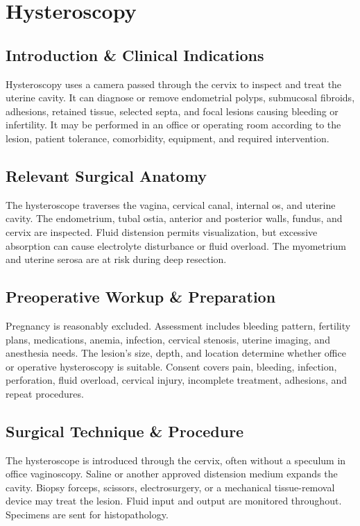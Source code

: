 \chapter{Hysteroscopy}

\section*{Introduction \& Clinical Indications}
Hysteroscopy uses a camera passed through the cervix to inspect and treat the uterine cavity. It can diagnose or remove endometrial polyps, submucosal fibroids, adhesions, retained tissue, selected septa, and focal lesions causing bleeding or infertility. It may be performed in an office or operating room according to the lesion, patient tolerance, comorbidity, equipment, and required intervention.

\section*{Relevant Surgical Anatomy}
The hysteroscope traverses the vagina, cervical canal, internal os, and uterine cavity. The endometrium, tubal ostia, anterior and posterior walls, fundus, and cervix are inspected. Fluid distension permits visualization, but excessive absorption can cause electrolyte disturbance or fluid overload. The myometrium and uterine serosa are at risk during deep resection.

\section*{Preoperative Workup \& Preparation}
Pregnancy is reasonably excluded. Assessment includes bleeding pattern, fertility plans, medications, anemia, infection, cervical stenosis, uterine imaging, and anesthesia needs. The lesion's size, depth, and location determine whether office or operative hysteroscopy is suitable. Consent covers pain, bleeding, infection, perforation, fluid overload, cervical injury, incomplete treatment, adhesions, and repeat procedures.

\section*{Surgical Technique \& Procedure}
The hysteroscope is introduced through the cervix, often without a speculum in office vaginoscopy. Saline or another approved distension medium expands the cavity. Biopsy forceps, scissors, electrosurgery, or a mechanical tissue-removal device may treat the lesion. Fluid input and output are monitored throughout. Specimens are sent for histopathology.

